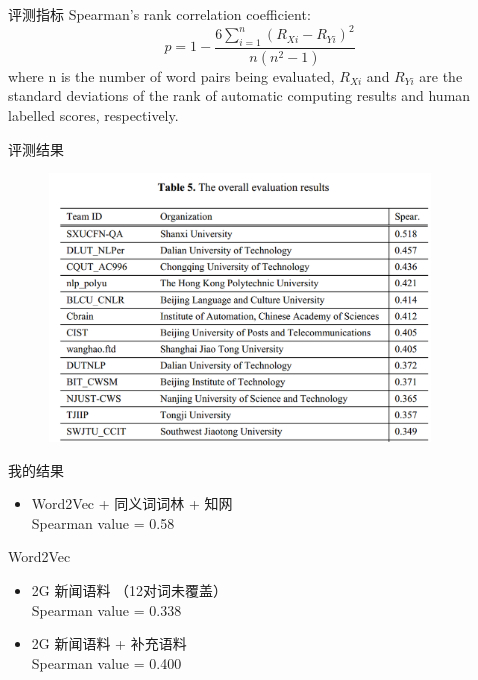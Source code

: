 \documentclass{beamer}
\begin{document}
    \begin{frame}{评测指标}
     Spearman's rank correlation coefficient: 
     \begin{equation}
        p = 1 - \frac{6\sum_{i=1}^n{(R_{Xi} - R_{Yi})^2}}{n(n^2 - 1)}
     \end{equation}
     where n is the number of word pairs being evaluated, $R_{Xi}$ and $R_{Yi}$ 
     are the standard deviations of the rank of automatic computing results and 
     human labelled scores, respectively.
    \end{frame}

    \begin{frame}{评测结果}
    \begin{center}
      \begin{figure}
      \includegraphics[width=4in,height=2.8in]{ws-result.png}
      \end{figure}
      \end{center}
    \end{frame}

    \begin{frame}{我的结果}
      \begin{itemize}
      \item Word2Vec + 同义词词林 + 知网 \\
      Spearman value = 0.58
      \end{itemize}
    \end{frame}

    \begin{frame}{Word2Vec}
    \begin{itemize}
      \item 2G 新闻语料 （12对词未覆盖）\\
      Spearman value = 0.338
      \item 2G 新闻语料 + 补充语料 \\
      Spearman value = 0.400
    \end{itemize}
    \end{frame}
\end{document}
